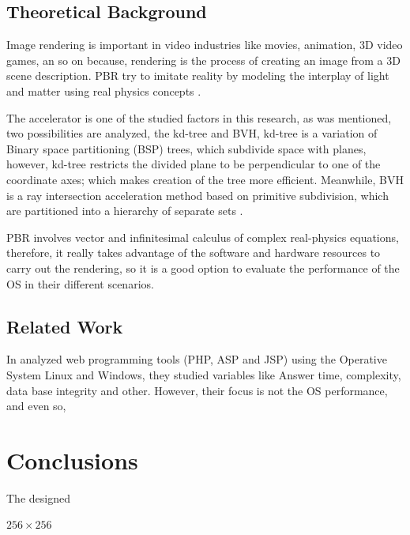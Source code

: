 \documentclass[conference]{IEEEtran}
\begin{document}
\subsection{Theoretical Background}
Image rendering is important in video industries like movies, animation, 3D video games, an so on because, rendering is the process of creating an image from a 3D scene description. PBR try to imitate reality by modeling the interplay of light and matter using real physics concepts \cite{PBR}. \par
The accelerator is one of the studied factors in this research, as was mentioned, two possibilities are analyzed, the kd-tree and BVH, kd-tree is a variation of Binary space partitioning (BSP) trees, which subdivide space with planes, however, kd-tree  restricts the divided plane to be perpendicular to one of the coordinate axes; which makes  creation of the tree more efficient. Meanwhile, BVH is a  ray intersection acceleration method based on primitive subdivision, which are partitioned into a hierarchy of separate sets  \cite{PBR}.\par
PBR involves vector and infinitesimal calculus of complex real-physics equations, therefore, it really takes advantage of the software and hardware resources to carry out the rendering, so it is a good option to evaluate the performance of the OS in their different scenarios.
\subsection{Related Work}
In \cite{duran2006analisis} analyzed web programming tools (PHP, ASP and JSP) using the Operative System Linux and Windows, they studied variables like Answer time, complexity, data base integrity and other. However, their focus is not the OS performance, and even so, 
\section{Conclusions}
The designed 





$256 \times 256$
\end{document}
